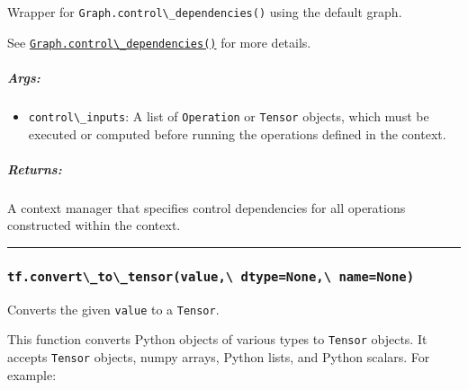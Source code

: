 Wrapper for \lstinline{Graph.control\_dependencies()} using the default
graph.

See
\href{../../api_docs/python/framework.md\#Graph.control_dependencies}{\lstinline{Graph.control\_dependencies()}}
for more details.

\subparagraph{Args: }\label{args-23}

\begin{itemize}
\tightlist
\item
  \lstinline{control\_inputs}: A list of \lstinline{Operation} or
  \lstinline{Tensor} objects, which must be executed or computed before
  running the operations defined in the context.
\end{itemize}

\subparagraph{Returns: }\label{returns-26}

A context manager that specifies control dependencies for all operations
constructed within the context.

\begin{center}\rule{0.5\linewidth}{\linethickness}\end{center}

\subsubsection{\texorpdfstring{\lstinline{tf.convert\_to\_tensor(value,\ dtype=None,\ name=None)}
}{tf.convert\_to\_tensor(value, dtype=None, name=None) }}\label{tf.convertux5ftoux5ftensorvalue-dtypenone-namenone}

Converts the given \lstinline{value} to a \lstinline{Tensor}.

This function converts Python objects of various types to
\lstinline{Tensor} objects. It accepts \lstinline{Tensor} objects, numpy
arrays, Python lists, and Python scalars. For example:

\begin{Shaded}
\begin{Highlighting}[]
  
\OperatorTok{=} \NormalTok{, }\NormalTok{, }\NormalTok{))}

 
  \OperatorTok{=} \OperatorTok{=}
   \OperatorTok{+} 

\OperatorTok{=} \NormalTok{my_func(tf.constant([[}\NormalTok{, }\NormalTok{], [}\NormalTok{, }\NormalTok{]]))}
\OperatorTok{=} \NormalTok{my_func([[}\NormalTok{, }\NormalTok{], [}\NormalTok{, }\NormalTok{]])}
\OperatorTok{=} \NormalTok{my_func(np.array([[}\NormalTok{, }\NormalTok{], [}\NormalTok{, }\NormalTok{]], dtype}\OperatorTok{=}
\end{Highlighting}
\end{Shaded}

